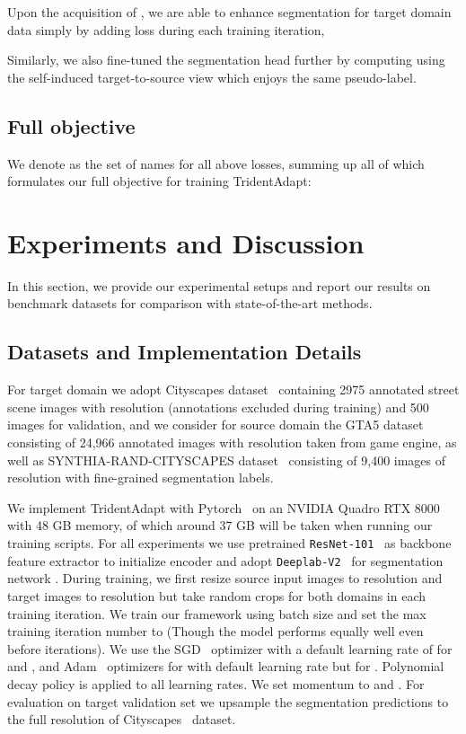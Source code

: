 \documentclass{bmvc2k}
\begin{document}
Upon the acquisition of , we are able to enhance segmentation for target domain data simply by adding loss  during each training iteration, 


Similarly, we also fine-tuned the segmentation head further by computing  using the self-induced target-to-source view  which enjoys the same pseudo-label.


\subsection{Full objective}



We denote  as the set of names for all above losses, summing up all of which formulates our full objective for training TridentAdapt: 



\section{Experiments and Discussion}
\label{sec:experiments}
In this section, we provide our experimental setups and report our results on benchmark datasets for comparison with state-of-the-art methods. 


\subsection{Datasets and Implementation Details}
For target domain we adopt Cityscapes dataset~\cite{cordts2016cityscapes} containing 2975 annotated street scene images with  resolution (annotations excluded during training) and 500 images for validation, and we consider for source domain the GTA5 dataset~\cite{richter2016playing} consisting of 24,966 annotated images with  resolution taken from game engine, as well as SYNTHIA-RAND-CITYSCAPES dataset~\cite{ros2016synthia} consisting of 9,400 images of  resolution with fine-grained segmentation labels.

We implement TridentAdapt with Pytorch~\cite{NEURIPS2019_9015} on an NVIDIA Quadro RTX 8000 with 48 GB memory, of which around 37 GB will be taken when running our training scripts. For all experiments we use pretrained {\tt ResNet-101}~\cite{he2016deep} as backbone feature extractor to initialize encoder  and adopt {\tt Deeplab-V2}~\cite{chen2017deeplab} for segmentation network . During training, we first resize source input images to  resolution and target images to  resolution but take  random crops for both domains in each training iteration. We train our framework using batch size  and set the max training iteration number to  (Though the model performs equally well even before  iterations). We use the SGD~\cite{robbins1951stochastic} optimizer with a default learning rate of  for  and ,  and Adam~\cite{adam:2015} optimizers for  with default learning rate  but  for . Polynomial decay policy is applied to all learning rates. We set momentum to  and . For evaluation on target validation set we upsample the segmentation predictions to the full resolution of Cityscapes~\cite{cordts2016cityscapes} dataset. 
\end{document}
